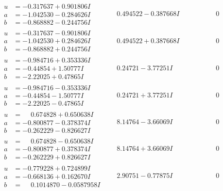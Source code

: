 \documentclass[1p]{elsarticle_modified}
\theoremstyle{definition}
\begin{document}
$$\begin{array}{c|c|c}
\begin{aligned}
u &= -0.317637 + 0.901806 I \\
a &= -1.042530 - 0.284626 I \\
b &= -0.868882 - 0.244756 I\end{aligned}
 & \phantom{-}0.494522 - 0.387668 I & \phantom{-0.000000 } 0 \\ \hline\begin{aligned}
u &= -0.317637 - 0.901806 I \\
a &= -1.042530 + 0.284626 I \\
b &= -0.868882 + 0.244756 I\end{aligned}
 & \phantom{-}0.494522 + 0.387668 I & \phantom{-0.000000 } 0 \\ \hline\begin{aligned}
u &= -0.984716 + 0.353336 I \\
a &= -0.44854 + 1.50777 I \\
b &= -2.22025 + 0.47865 I\end{aligned}
 & \phantom{-}0.24721 - 3.77251 I & \phantom{-0.000000 } 0 \\ \hline\begin{aligned}
u &= -0.984716 - 0.353336 I \\
a &= -0.44854 - 1.50777 I \\
b &= -2.22025 - 0.47865 I\end{aligned}
 & \phantom{-}0.24721 + 3.77251 I & \phantom{-0.000000 } 0 \\ \hline\begin{aligned}
u &= \phantom{-}0.674828 + 0.650638 I \\
a &= -0.800877 - 0.378374 I \\
b &= -0.262229 - 0.826627 I\end{aligned}
 & \phantom{-}8.14764 - 3.66069 I & \phantom{-0.000000 } 0 \\ \hline\begin{aligned}
u &= \phantom{-}0.674828 - 0.650638 I \\
a &= -0.800877 + 0.378374 I \\
b &= -0.262229 + 0.826627 I\end{aligned}
 & \phantom{-}8.14764 + 3.66069 I & \phantom{-0.000000 } 0 \\ \hline\begin{aligned}
u &= -0.779228 + 0.724899 I \\
a &= -0.668136 + 0.162670 I \\
b &= \phantom{-}0.1014870 - 0.0587958 I\end{aligned}
 & \phantom{-}2.90751 - 0.77875 I & \phantom{-0.000000 } 0 \\ \hline\begin{aligned}

\end{aligned}
\end{array}$$
\end{document}
